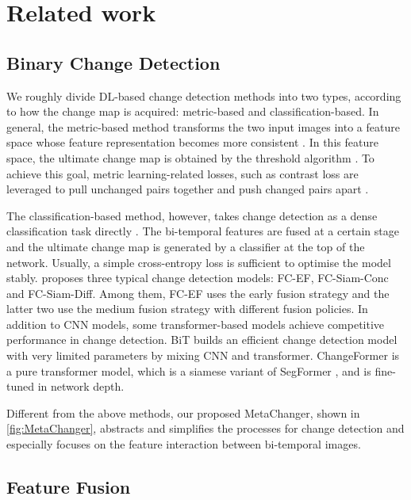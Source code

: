 \documentclass[10pt,twocolumn,letterpaper]{article}
\begin{document}
\section{Related work}
\subsection{Binary Change Detection}
We roughly divide DL-based change detection methods into two types, according to how the change map is acquired: metric-based and classification-based. In general, the metric-based method transforms the two input images into a feature space whose feature representation becomes more consistent \cite{shi2021deeply, manas2021seasonal}. In this feature space, the ultimate change map is obtained by the threshold algorithm \cite{liu2016deep}. To achieve this goal, metric learning-related losses, such as contrast loss \cite{hadsell2006dimensionality} are leveraged to pull unchanged pairs together and push changed pairs apart \cite{zhan2017change, chen2020spatial}.

The classification-based method, however, takes change detection as a dense classification task directly \cite{zheng2021change, fang2021snunet, zheng2022changemask, chen2022fccdn}. The bi-temporal features are fused at a certain stage and the ultimate change map is generated by a classifier at the top of the network. Usually, a simple cross-entropy loss is sufficient to optimise the model stably. \cite{daudt2018fully} proposes three typical change detection models: FC-EF, FC-Siam-Conc and FC-Siam-Diff. Among them, FC-EF uses the early fusion strategy and the latter two use the medium fusion strategy with different fusion policies. In addition to CNN models, some transformer-based models achieve competitive performance in change detection. BiT \cite{chen2021efficient} builds an efficient change detection model with very limited parameters by mixing CNN and transformer. ChangeFormer \cite{bandara2022transformerbased} is a pure transformer model, which is a siamese variant of SegFormer \cite{xie2021segformer}, and is fine-tuned in network depth.

Different from the above methods, our proposed MetaChanger, shown in \cref{fig:MetaChanger}, abstracts and simplifies the processes for change detection and especially focuses on the feature interaction between bi-temporal images.

\subsection{Feature Fusion}
\end{document}
